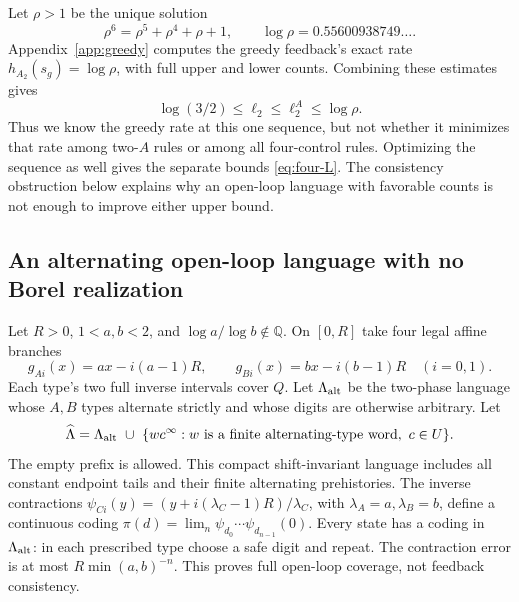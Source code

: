 \documentclass[11pt,reqno]{amsart}
\numberwithin{equation}{section}
\theoremstyle{definition}
\theoremstyle{definition}
\begin{document}
Let $\rho>1$ be the unique solution
\begin{equation}\label{eq:rho}
 \rho^6=\rho^5+\rho^4+\rho+1,
 \qquad\log\rho=0.55600938749\ldots.
\end{equation}
Appendix~\ref{app:greedy} computes the greedy feedback's exact rate
$h_{A_2}(s_g)=\log\rho$, with full upper and lower counts.
Combining these estimates gives
\begin{equation}\label{eq:four-even}
 \log(3/2)\le\ell_2\le\ell_2^A\le\log\rho.
\end{equation}
Thus we know the greedy rate at this one sequence, but not whether
it minimizes that rate among two-$A$ rules or among all four-control
rules. Optimizing the sequence as well gives the separate bounds
\eqref{eq:four-L}. The consistency obstruction below explains why an
open-loop language with favorable counts is not enough to improve
either upper bound.


\subsection{An alternating open-loop language with no Borel realization}
Let $R>0$, $1<a,b<2$, and $\log a/\log b\notin\mathbb Q$.
On $[0,R]$ take four legal affine branches
\[
 g_{Ai}(x)=ax-i(a-1)R,\qquad
 g_{Bi}(x)=bx-i(b-1)R\quad(i=0,1).
\]
Each type's two full inverse intervals cover $Q$. Let
$\Lambda_{\rm alt}$ be the two-phase language whose $A,B$ types
alternate strictly and whose digits are otherwise arbitrary. Let
\[
 \widehat\Lambda=\Lambda_{\rm alt}\ \cup\
 \{w c^\infty:w\text{ is a finite alternating-type word},\ c\in U\}.
\]
The empty prefix is allowed. This compact shift-invariant language
includes all constant endpoint tails and their finite alternating
prehistories. The inverse contractions
$\psi_{Ci}(y)=(y+i(\lambda_C-1)R)/\lambda_C$, with
$\lambda_A=a,\lambda_B=b$, define a continuous coding
$\pi(d)=\lim_n\psi_{d_0}\cdots\psi_{d_{n-1}}(0)$.
Every state has a coding in $\Lambda_{\rm alt}$: in each prescribed
type choose a safe digit and repeat. The contraction error is at
most $R\min(a,b)^{-n}$. This proves full open-loop coverage, not
feedback consistency.
\end{document}
